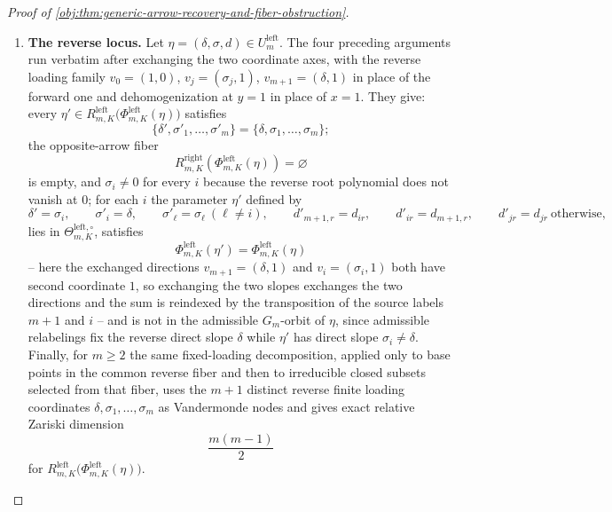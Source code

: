\documentclass[11pt]{article}
\begin{document}
\begin{proof}[Proof of \cref{obj:thm:generic-arrow-recovery-and-fiber-obstruction}]
\begin{enumerate}
\item \textbf{The reverse locus.}  Let \(\eta=(\delta,\sigma,d)\in U^{\mathrm{left}}_m\).  The four preceding arguments run verbatim after exchanging the two coordinate axes, with the reverse loading family \(v_0=(1,0)\), \(v_j=(\sigma_j,1)\), \(v_{m+1}=(\delta,1)\) in place of the forward one and dehomogenization at \(y=1\) in place of \(x=1\).  They give: every \(\eta'\in R^{\mathrm{left}}_{m,K}\bigl(\Phi^{\mathrm{left}}_{m,K}(\eta)\bigr)\) satisfies
\[
\{\delta',\sigma'_1,\ldots,\sigma'_m\}=\{\delta,\sigma_1,\ldots,\sigma_m\};
\]
the opposite-arrow fiber
\[
R^{\mathrm{right}}_{m,K}\!\left(\Phi^{\mathrm{left}}_{m,K}(\eta)\right)=\varnothing
\]
is empty, and \(\sigma_i\ne0\) for every \(i\) because the reverse root polynomial does not vanish at \(0\); for each \(i\) the parameter \(\eta'\) defined by
\[
\delta'=\sigma_i,\qquad \sigma'_i=\delta,\qquad \sigma'_\ell=\sigma_\ell\ (\ell\ne i),
\qquad
d'_{m+1,r}=d_{ir},\qquad d'_{ir}=d_{m+1,r},\qquad d'_{jr}=d_{jr}\ \text{otherwise},
\]
lies in \(\Theta^{\mathrm{left},\circ}_{m,K}\), satisfies
\[
\Phi^{\mathrm{left}}_{m,K}(\eta')=\Phi^{\mathrm{left}}_{m,K}(\eta)
\]
-- here the exchanged directions \(v_{m+1}=(\delta,1)\) and \(v_i=(\sigma_i,1)\) both have second coordinate \(1\), so exchanging the two slopes exchanges the two directions and the sum is reindexed by the transposition of the source labels \(m+1\) and \(i\) -- and is not in the admissible \(G_m\)-orbit of \(\eta\), since admissible relabelings fix the reverse direct slope \(\delta\) while \(\eta'\) has direct slope \(\sigma_i\ne\delta\).  Finally, for \(m\ge2\) the same fixed-loading decomposition, applied only to base points in the common reverse fiber and then to irreducible closed subsets selected from that fiber, uses the \(m+1\) distinct reverse finite loading coordinates \(\delta,\sigma_1,\ldots,\sigma_m\) as Vandermonde nodes and gives exact relative Zariski dimension
\[
\frac{m(m-1)}{2}
\]
for \(R^{\mathrm{left}}_{m,K}\bigl(\Phi^{\mathrm{left}}_{m,K}(\eta)\bigr)\).
\end{enumerate}
\end{proof}
\end{document}
